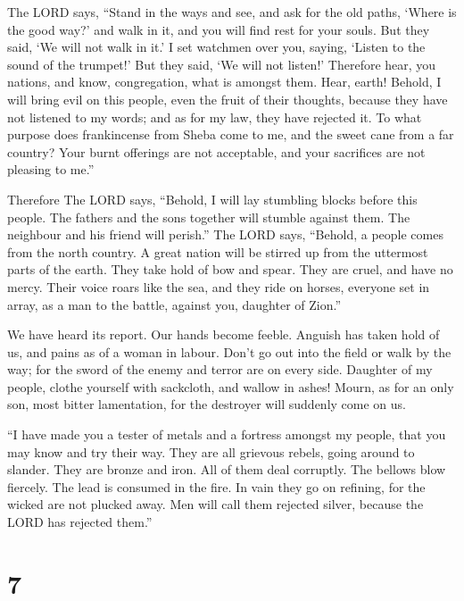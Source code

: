  The LORD says, ``Stand in the ways and see, and ask for
the old paths, `Where is the good way?' and walk in it, and you will
find rest for your souls. But they said, `We will not walk in it.'
 I set watchmen over you, saying, `Listen to the sound of
the trumpet!' But they said, `We will not listen!' 
Therefore hear, you nations, and know, congregation, what is amongst
them.  Hear, earth! Behold, I will bring evil on this
people, even the fruit of their thoughts, because they have not listened
to my words; and as for my law, they have rejected it. 
To what purpose does frankincense from Sheba come to me, and the sweet
cane from a far country? Your burnt offerings are not acceptable, and
your sacrifices are not pleasing to me.''

 Therefore The LORD says, ``Behold, I will lay stumbling
blocks before this people. The fathers and the sons together will
stumble against them. The neighbour and his friend will perish.''
 The LORD says, ``Behold, a people comes from the north
country. A great nation will be stirred up from the uttermost parts of
the earth.  They take hold of bow and spear. They are
cruel, and have no mercy. Their voice roars like the sea, and they ride
on horses, everyone set in array, as a man to the battle, against you,
daughter of Zion.''

 We have heard its report. Our hands become feeble.
Anguish has taken hold of us, and pains as of a woman in labour.
 Don't go out into the field or walk by the way; for the
sword of the enemy and terror are on every side. 
Daughter of my people, clothe yourself with sackcloth, and wallow in
ashes! Mourn, as for an only son, most bitter lamentation, for the
destroyer will suddenly come on us.

 ``I have made you a tester of metals and a fortress
amongst my people, that you may know and try their way. 
They are all grievous rebels, going around to slander. They are bronze
and iron. All of them deal corruptly.  The bellows blow
fiercely. The lead is consumed in the fire. In vain they go on refining,
for the wicked are not plucked away.  Men will call them
rejected silver, because the LORD has rejected them.''

\hypertarget{section-6}{%
\section{7}\label{section-6}}

